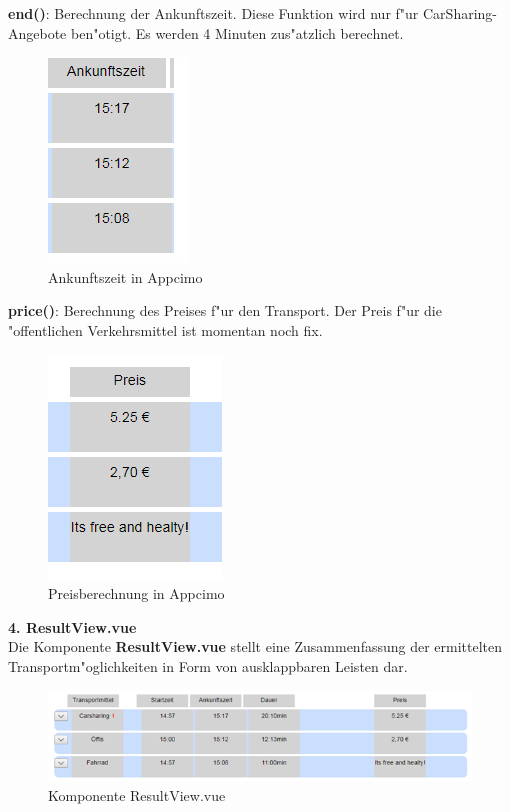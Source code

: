 \documentclass[a4paper, 11pt]{scrreprt}
\begin{document}
\textbf{end()}:  Berechnung der Ankunftszeit. Diese Funktion wird nur f"ur CarSharing-Angebote ben"otigt.  Es werden 4 Minuten zus"atzlich berechnet.

\begin{figure} [H]
\begin{center}
\includegraphics[scale=1]{end.png}
\caption{Ankunftszeit in Appcimo}
\label{end}
\end{center}
\end{figure}

\textbf{price()}:  Berechnung des Preises f"ur den Transport. Der Preis f"ur die "offentlichen Verkehrsmittel ist momentan noch fix.

\begin{figure} [H]
\begin{center}
\includegraphics[scale=1]{price.png}
\caption{Preisberechnung in Appcimo}
\label{price}
\end{center}
\end{figure}

\textbf{4. ResultView.vue}\\

Die Komponente \textbf{ResultView.vue} stellt eine Zusammenfassung der ermittelten Transportm"oglichkeiten in Form von ausklappbaren Leisten dar. \\

\begin{figure} [H]
\begin{center}
\includegraphics[scale=1]{resultview.png}
\caption{Komponente ResultView.vue}
\label{resultview}
\end{center}
\end{figure}
\end{document}
